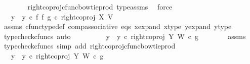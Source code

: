 \begin{isabellebody}
\ \ \ \ \ \ \isamarkupfalse%
\ right{\isacharunderscore}{\kern0pt}coproj{\isacharunderscore}{\kern0pt}cfunc{\isacharunderscore}{\kern0pt}bowtie{\isacharunderscore}{\kern0pt}prod\ type{\isacharunderscore}{\kern0pt}assms\ \isamarkupfalse%
\ force\isanewline
\ \ \ \ \isamarkupfalse%
\ \isamarkupfalse%
\ {\isachardoublequoteopen}{\isachardot}{\kern0pt}{\isachardot}{\kern0pt}{\isachardot}{\kern0pt}\ {\isacharequal}{\kern0pt}\ {\isacharparenleft}{\kern0pt}y{}\ {\isasymamalg}\ y{}{\isacharparenright}{\kern0pt}\ {\isasymcirc}\isactrlsub c\ {\isacharparenleft}{\kern0pt}f\ {\isasymbowtie}\isactrlsub f\ g{\isacharparenright}{\kern0pt}\ {\isasymcirc}\isactrlsub c\ right{\isacharunderscore}{\kern0pt}coproj\ X\ V{\isachardoublequoteclose}\isanewline
\ \ \ \ \ \ \isamarkupfalse%
\ assms\ cfunc{\isacharunderscore}{\kern0pt}type{\isacharunderscore}{\kern0pt}def\ comp{\isacharunderscore}{\kern0pt}associative\ eqs\ x{\isacharunderscore}{\kern0pt}expand\ x{\isacharunderscore}{\kern0pt}type\ y{\isacharunderscore}{\kern0pt}expand\ y{\isacharunderscore}{\kern0pt}type\ \isamarkupfalse%
\ {\isacharparenleft}{\kern0pt}typecheck{\isacharunderscore}{\kern0pt}cfuncs{\isacharcomma}{\kern0pt}\ auto{\isacharparenright}{\kern0pt}\isanewline
\ \ \ \ \isamarkupfalse%
\ \isamarkupfalse%
\ {\isachardoublequoteopen}{\isachardot}{\kern0pt}{\isachardot}{\kern0pt}{\isachardot}{\kern0pt}\ {\isacharequal}{\kern0pt}\ {\isacharparenleft}{\kern0pt}y{}\ {\isasymamalg}\ y{}{\isacharparenright}{\kern0pt}\ {\isasymcirc}\isactrlsub c\ right{\isacharunderscore}{\kern0pt}coproj\ Y\ W\ {\isasymcirc}\isactrlsub c\ g{\isachardoublequoteclose}\isanewline
\ \ \ \ \ \ \isamarkupfalse%
\ assms\ \isamarkupfalse%
\ {\isacharparenleft}{\kern0pt}typecheck{\isacharunderscore}{\kern0pt}cfuncs{\isacharcomma}{\kern0pt}\ simp\ add{\isacharcolon}{\kern0pt}\ right{\isacharunderscore}{\kern0pt}coproj{\isacharunderscore}{\kern0pt}cfunc{\isacharunderscore}{\kern0pt}bowtie{\isacharunderscore}{\kern0pt}prod{\isacharparenright}{\kern0pt}\isanewline
\ \ \ \ \isamarkupfalse%
\ \isamarkupfalse%
\ {\isachardoublequoteopen}{\isachardot}{\kern0pt}{\isachardot}{\kern0pt}{\isachardot}{\kern0pt}\ {\isacharequal}{\kern0pt}\ {\isacharparenleft}{\kern0pt}{\isacharparenleft}{\kern0pt}y{}\ {\isasymamalg}\ y{}{\isacharparenright}{\kern0pt}\ {\isasymcirc}\isactrlsub c\ right{\isacharunderscore}{\kern0pt}coproj\ Y\ W{\isacharparenright}{\kern0pt}\ {\isasymcirc}\isactrlsub c\ g{\isachardoublequoteclose}\isanewline

\end{isabellebody}
